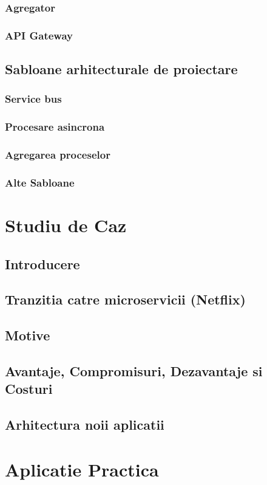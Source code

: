 \documentclass[11pt,titlepage]{article}
\begin{document}
		\subsubsection{Agregator}
		\subsubsection{API Gateway}
	\subsection{Sabloane arhitecturale de proiectare}
		\subsubsection{Service bus}
		\subsubsection{Procesare asincrona}
		\subsubsection{Agregarea proceselor}
		\subsubsection{Alte Sabloane}
\section{Studiu de Caz}
	\subsection{Introducere}
	\subsection{Tranzitia catre microservicii (Netflix)}
	\subsection{Motive}
	\subsection{Avantaje, Compromisuri, Dezavantaje si Costuri}
	\subsection{Arhitectura noii aplicatii}
	
\section{Aplicatie Practica}
\end{document}
